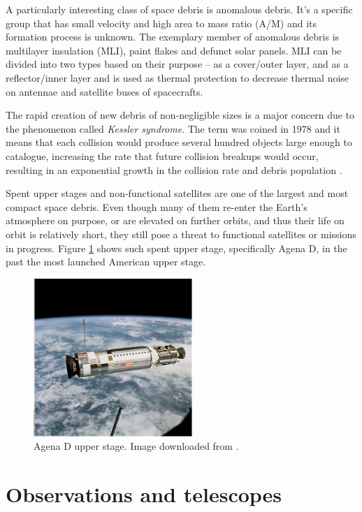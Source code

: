 	A particularly interesting class of space debris is anomalous debris. It's a specific group that has small velocity and high area to mass ratio (A/M) and its formation process is unknown. The exemplary member of anomalous debris is multilayer insulation (MLI), paint flakes and defunct solar panels. MLI can be divided into two types based on their purpose – as a cover/outer layer, and as a reflector/inner layer and is used as thermal protection to decrease thermal noise on antennae and satellite buses of spacecrafts.
	
	The rapid creation of new debris of non-negligible sizes is a major concern due to the phenomenon called \emph{Kessler syndrome}. The term was coined in 1978 and it means that each collision would produce several hundred objects large enough to catalogue, increasing the rate that future collision breakups would occur, resulting in an exponential growth in the collision rate and debris population \citep{kessler}.
	
	Spent upper stages and non-functional satellites are one of the largest and most compact space debris. Even though many of them re-enter the Earth's atmosphere on purpose, or are elevated on further orbits, and thus their life on orbit is relatively short, they still pose a threat to functional satellites or missions in progress. Figure \ref{fig:upperstage} shows such spent upper stage, specifically Agena D, in the past the most launched American upper stage.
	
\begin{figure}[H]
\centering
  \includegraphics[width=6cm]{images/upperstage}
  \caption{Agena D upper stage. Image downloaded from \citep{NASA}.}
  \label{fig:upperstage}
\end{figure}
	
\pagebreak


\section{Observations and telescopes}\label{sec:observations_telescopes}

